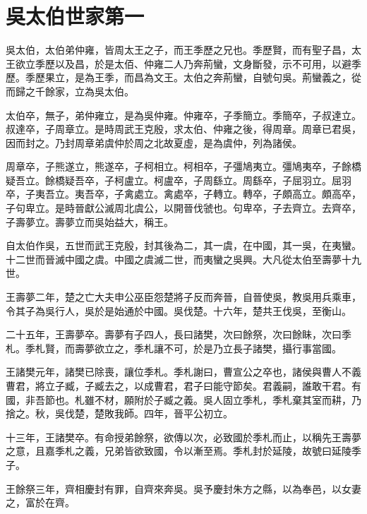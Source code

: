 \chapter{吳太伯世家第一}

吳太伯，太伯弟仲雍，皆周太王之子，而王季歷之兄也。季歷賢，而有聖子昌，太王欲立季歷以及昌，於是太佰、仲雍二人乃奔荊蠻，文身斷發，示不可用，以避季歷。季歷果立，是為王季，而昌為文王。太伯之奔荊蠻，自號句吳。荊蠻義之，從而歸之千餘家，立為吳太伯。

太伯卒，無子，弟仲雍立，是為吳仲雍。仲雍卒，子季簡立。季簡卒，子叔達立。叔達卒，子周章立。是時周武王克殷，求太伯、仲雍之後，得周章。周章已君吳，因而封之。乃封周章弟虞仲於周之北故夏虛，是為虞仲，列為諸侯。

周章卒，子熊遂立，熊遂卒，子柯相立。柯相卒，子彊鳩夷立。彊鳩夷卒，子餘橋疑吾立。餘橋疑吾卒，子柯盧立。柯盧卒，子周繇立。周繇卒，子屈羽立。屈羽卒，子夷吾立。夷吾卒，子禽處立。禽處卒，子轉立。轉卒，子頗高立。頗高卒，子句卑立。是時晉獻公滅周北虞公，以開晉伐虢也。句卑卒，子去齊立。去齊卒，子壽夢立。壽夢立而吳始益大，稱王。

自太伯作吳，五世而武王克殷，封其後為二，其一虞，在中國，其一吳，在夷蠻。十二世而晉滅中國之虞。中國之虞滅二世，而夷蠻之吳興。大凡從太伯至壽夢十九世。

王壽夢二年，楚之亡大夫申公巫臣怨楚將子反而奔晉，自晉使吳，教吳用兵乘車，令其子為吳行人，吳於是始通於中國。吳伐楚。十六年，楚共王伐吳，至衡山。

二十五年，王壽夢卒。壽夢有子四人，長曰諸樊，次曰餘祭，次曰餘眛，次曰季札。季札賢，而壽夢欲立之，季札讓不可，於是乃立長子諸樊，攝行事當國。

王諸樊元年，諸樊已除喪，讓位季札。季札謝曰，曹宣公之卒也，諸侯與曹人不義曹君，將立子臧，子臧去之，以成曹君，君子曰能守節矣。君義嗣，誰敢干君。有國，非吾節也。札雖不材，願附於子臧之義。吳人固立季札，季札棄其室而耕，乃捨之。秋，吳伐楚，楚敗我師。四年，晉平公初立。

十三年，王諸樊卒。有命授弟餘祭，欲傳以次，必致國於季札而止，以稱先王壽夢之意，且嘉季札之義，兄弟皆欲致國，令以漸至焉。季札封於延陵，故號曰延陵季子。

王餘祭三年，齊相慶封有罪，自齊來奔吳。吳予慶封朱方之縣，以為奉邑，以女妻之，富於在齊。

